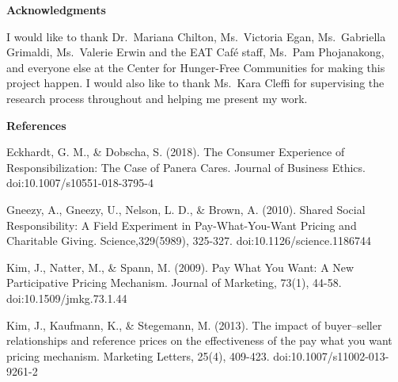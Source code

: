 \textbf{Acknowledgments}

I would like to thank Dr.\ Mariana Chilton, Ms.\ Victoria Egan, Ms.\ Gabriella Grimaldi, Ms.\ Valerie Erwin and the EAT Café staff, Ms.\ Pam Phojanakong, and everyone else at the Center for Hunger-Free Communities for making this project happen. I would also like to thank Ms.\ Kara Cleffi for supervising the research process throughout and helping me present my work.

\textbf{References}

Eckhardt, G. M., \& Dobscha, S. (2018). The Consumer Experience of Responsibilization: The Case of Panera Cares. Journal of Business Ethics. doi:10.1007/s10551-018-3795-4

Gneezy, A., Gneezy, U., Nelson, L. D., \& Brown, A. (2010). Shared Social Responsibility: A Field Experiment in Pay-What-You-Want Pricing and Charitable Giving. Science,329(5989), 325-327. doi:10.1126/science.1186744

Kim, J., Natter, M., \& Spann, M. (2009). Pay What You Want: A New Participative Pricing Mechanism. Journal of Marketing, 73(1), 44-58. doi:10.1509/jmkg.73.1.44

Kim, J., Kaufmann, K., \& Stegemann, M. (2013). The impact of buyer–seller relationships and reference prices on the effectiveness of the pay what you want pricing mechanism. Marketing Letters, 25(4), 409-423. doi:10.1007/s11002-013-9261-2


\setcounter{figure}{0}